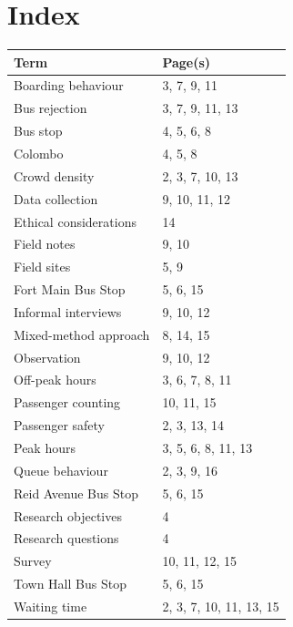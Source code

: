 \documentclass[12pt,a4paper]{report}
\begin{document}
\chapter*{Index}

\begin{table}[h!]
\centering
\begin{tabular}{p{7cm} p{5cm}}
\toprule
\textbf{Term} & \textbf{Page(s)} \\
\midrule
Boarding behaviour          & 3, 7, 9, 11 \\
Bus rejection               & 3, 7, 9, 11, 13 \\
Bus stop                    & 4, 5, 6, 8 \\
Colombo                     & 4, 5, 8 \\
Crowd density               & 2, 3, 7, 10, 13 \\
Data collection             & 9, 10, 11, 12 \\
Ethical considerations      & 14 \\
Field notes                 & 9, 10 \\
Field sites                 & 5, 9 \\
Fort Main Bus Stop          & 5, 6, 15 \\
Informal interviews         & 9, 10, 12 \\
Mixed-method approach       & 8, 14, 15 \\
Observation                 & 9, 10, 12 \\
Off-peak hours              & 3, 6, 7, 8, 11 \\
Passenger counting          & 10, 11, 15 \\
Passenger safety            & 2, 3, 13, 14 \\
Peak hours                  & 3, 5, 6, 8, 11, 13 \\
Queue behaviour             & 2, 3, 9, 16 \\
Reid Avenue Bus Stop        & 5, 6, 15 \\
Research objectives         & 4 \\
Research questions          & 4 \\
Survey                      & 10, 11, 12, 15 \\
Town Hall Bus Stop          & 5, 6, 15 \\
Waiting time                & 2, 3, 7, 10, 11, 13, 15 \\
\bottomrule
\end{tabular}
\end{table}
\end{document}
